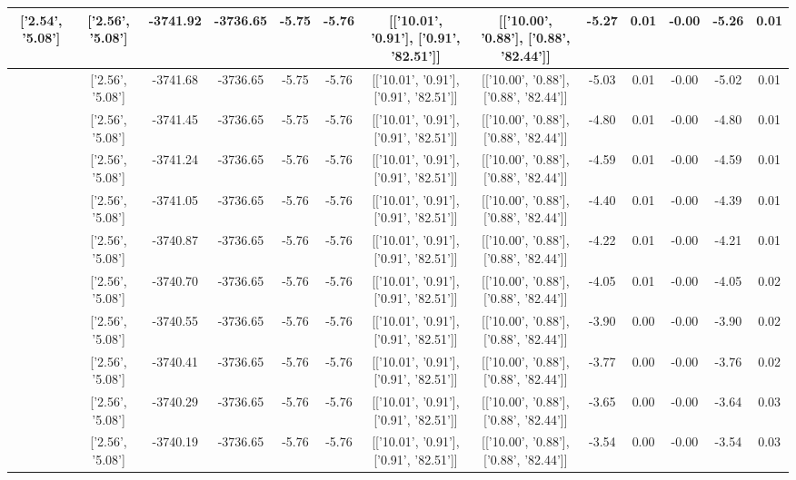 \begin{table}[htbp]
\begin{adjustbox}{angle=90}
\begin{tabular}{|c|c|c|c|c|c|c|c|c|c|c|c|c|}
 ['2.54', '5.08'] & ['2.56', '5.08'] & -3741.92 & -3736.65 & -5.75 & -5.76 & [['10.01', '0.91'], ['0.91', '82.51']] & [['10.00', '0.88'], ['0.88', '82.44']] & -5.27 & 0.01 & -0.00 & -5.26 & 0.01\\ \hline
 ['2.54', '5.08'] & ['2.56', '5.08'] & -3741.68 & -3736.65 & -5.75 & -5.76 & [['10.01', '0.91'], ['0.91', '82.51']] & [['10.00', '0.88'], ['0.88', '82.44']] & -5.03 & 0.01 & -0.00 & -5.02 & 0.01\\ \hline
 ['2.55', '5.08'] & ['2.56', '5.08'] & -3741.45 & -3736.65 & -5.75 & -5.76 & [['10.01', '0.91'], ['0.91', '82.51']] & [['10.00', '0.88'], ['0.88', '82.44']] & -4.80 & 0.01 & -0.00 & -4.80 & 0.01\\ \hline
 ['2.55', '5.08'] & ['2.56', '5.08'] & -3741.24 & -3736.65 & -5.76 & -5.76 & [['10.01', '0.91'], ['0.91', '82.51']] & [['10.00', '0.88'], ['0.88', '82.44']] & -4.59 & 0.01 & -0.00 & -4.59 & 0.01\\ \hline
 ['2.55', '5.08'] & ['2.56', '5.08'] & -3741.05 & -3736.65 & -5.76 & -5.76 & [['10.01', '0.91'], ['0.91', '82.51']] & [['10.00', '0.88'], ['0.88', '82.44']] & -4.40 & 0.01 & -0.00 & -4.39 & 0.01\\ \hline
 ['2.55', '5.08'] & ['2.56', '5.08'] & -3740.87 & -3736.65 & -5.76 & -5.76 & [['10.01', '0.91'], ['0.91', '82.51']] & [['10.00', '0.88'], ['0.88', '82.44']] & -4.22 & 0.01 & -0.00 & -4.21 & 0.01\\ \hline
 ['2.55', '5.08'] & ['2.56', '5.08'] & -3740.70 & -3736.65 & -5.76 & -5.76 & [['10.01', '0.91'], ['0.91', '82.51']] & [['10.00', '0.88'], ['0.88', '82.44']] & -4.05 & 0.01 & -0.00 & -4.05 & 0.02\\ \hline
 ['2.55', '5.08'] & ['2.56', '5.08'] & -3740.55 & -3736.65 & -5.76 & -5.76 & [['10.01', '0.91'], ['0.91', '82.51']] & [['10.00', '0.88'], ['0.88', '82.44']] & -3.90 & 0.00 & -0.00 & -3.90 & 0.02\\ \hline
 ['2.55', '5.08'] & ['2.56', '5.08'] & -3740.41 & -3736.65 & -5.76 & -5.76 & [['10.01', '0.91'], ['0.91', '82.51']] & [['10.00', '0.88'], ['0.88', '82.44']] & -3.77 & 0.00 & -0.00 & -3.76 & 0.02\\ \hline
 ['2.55', '5.08'] & ['2.56', '5.08'] & -3740.29 & -3736.65 & -5.76 & -5.76 & [['10.01', '0.91'], ['0.91', '82.51']] & [['10.00', '0.88'], ['0.88', '82.44']] & -3.65 & 0.00 & -0.00 & -3.64 & 0.03\\ \hline
 ['2.56', '5.08'] & ['2.56', '5.08'] & -3740.19 & -3736.65 & -5.76 & -5.76 & [['10.01', '0.91'], ['0.91', '82.51']] & [['10.00', '0.88'], ['0.88', '82.44']] & -3.54 & 0.00 & -0.00 & -3.54 & 0.03\\ \hline

\end{tabular}
\end{adjustbox}
\end{table}
